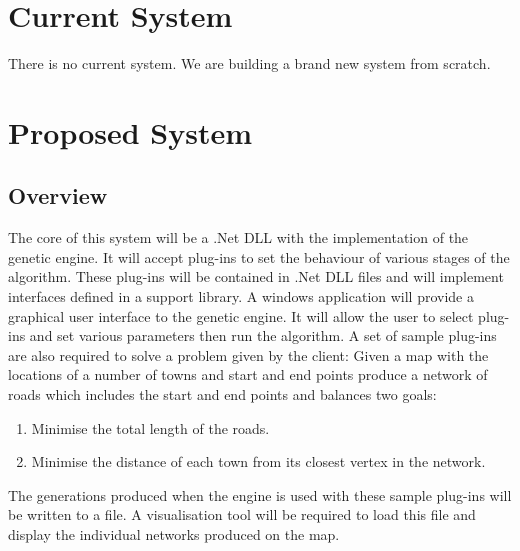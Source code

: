 %
%
\section{Current System}
There is no current system. We are building a brand new system from scratch.


%
%
\section{Proposed System}
\subsection{Overview}
The core of this system will be a .Net DLL with the implementation of the genetic engine. It will accept plug-ins to set the behaviour of various stages of the algorithm. These plug-ins will be contained in .Net DLL files and will implement interfaces defined in a support library.
A windows application will provide a graphical user interface to the genetic engine. It will allow the user to select plug-ins and set various parameters then run the algorithm.
A set of sample plug-ins are also required to solve a problem given by the client: Given a map with the locations of a number of towns and start and end points produce a network of roads which includes the start and end points and balances two goals:
\begin{enumerate}
\item Minimise the total length of the roads.
\item Minimise the distance of each town from its closest vertex in the network.
\end{enumerate}
The generations produced when the engine is used with these sample plug-ins will be written to a file. A visualisation tool will be required to load this file and display the individual networks produced on the map.

